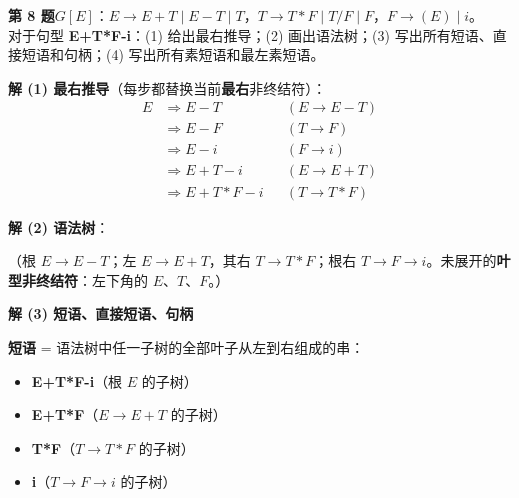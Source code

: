 \documentclass[12pt,a4paper,fontset=windows]{ctexart}
\begin{document}
\begin{qbox}
{\large\bfseries 第 8 题}\quad $G[E]$：$E \to E{+}T \mid E{-}T \mid T$，$T \to T{*}F \mid T/F \mid F$，$F \to (E) \mid i$。\\
对于句型 \textbf{E+T*F-i}：(1) 给出最右推导；(2) 画出语法树；(3) 写出所有短语、直接短语和句柄；(4) 写出所有素短语和最左素短语。
\end{qbox}

\textbf{解 (1) 最右推导}（每步都替换当前\textbf{最右}非终结符）：
\[
\begin{aligned}
E &\Rightarrow E-T        &&(E \to E-T)\\
  &\Rightarrow E-F        &&(T \to F)\\
  &\Rightarrow E-i        &&(F \to i)\\
  &\Rightarrow E+T-i      &&(E \to E+T)\\
  &\Rightarrow E+T*F-i    &&(T \to T*F)
\end{aligned}
\]

\textbf{解 (2) 语法树}：

\begin{center}
\end{center}

（根 $E \to E-T$；左 $E \to E+T$，其右 $T \to T*F$；根右 $T \to F \to i$。未展开的\textbf{叶型非终结符}：左下角的 $E$、$T$、$F$。）

\textbf{解 (3) 短语、直接短语、句柄}

\textbf{短语} = 语法树中任一子树的全部叶子从左到右组成的串：
\begin{itemize}
\item \textbf{E+T*F-i}（根 $E$ 的子树）
\item \textbf{E+T*F}（$E \to E+T$ 的子树）
\item \textbf{T*F}（$T \to T*F$ 的子树）
\item \textbf{i}（$T \to F \to i$ 的子树）
\end{itemize}
\end{document}
